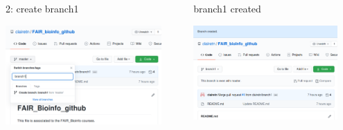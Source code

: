 \begin{frame}{ }
\begin{columns}
\begin{column}{0.5\textwidth}
\begin{exampleblock}{2: create branch1}
    \begin{center}
    \includegraphics[height=3.8cm]{05_history/Images/FAIR_github_branch1.png}
    \end{center}
\end{exampleblock}
\end{column}
\begin{column}{0.46\textwidth}
\begin{exampleblock}{branch1 created}
    \begin{center}
    \includegraphics[height=3.6cm]{05_history/Images/FAIR_github_branch1ok.png}
    \end{center}
\end{exampleblock}
\end{column}
\end{columns}
\end{frame}
